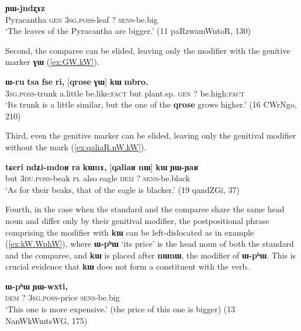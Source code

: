 \documentclass[oldfontcommands,oneside,a4paper,11pt]{article}
\newcommand{\ipa}[1]{{\phon\textbf{#1}}}
\begin{document}
\begin{exe}
\ex \label{ex:GW.WjwaR.kW}
\gll 
[\ipa{tɤru}  	\ipa{ɣɯ}  	\ipa{ɯ-jwaʁ}]  	\ipa{kɯ}  	\ipa{ɲɯ-jndʐɤz}  \\
Pyracantha \textsc{gen} \textsc{3sg.poss}-leaf ?{ } \textsc{sens}-be.big \\
\glt `The leaves of the Pyracantha are bigger.' (11 paRzwamWntoR, 130)
 \end{exe}
 
Second,  the comparee can be elided, leaving only the modifier with the genitive marker \ipa{ɣɯ} (\ref{ex:GW.kW}).  

\begin{exe}
\ex \label{ex:GW.kW}
\gll 
\ipa{ɯ-ru}  	\ipa{tsa}  	\ipa{fse}  	\ipa{ri,}  	[\ipa{qrose}  	\ipa{ɣɯ}]  	\ipa{kɯ}  	\ipa{mbro.}  \\
\textsc{3sg.poss}-trunk a.little be.like:\textsc{fact} but plant.sp. \textsc{gen} ?{ } be.high:\textsc{fact} \\
\glt `Its  trunk is a little similar, but the one of the \ipa{qrose} grows higher.' (16 CWrNgo,  210)
\end{exe}

Third, even the genitive marker can be elided, leaving only the genitival modifier without the mark (\ref{ex:qaliaR.nW.kW}).

\begin{exe}
\ex \label{ex:qaliaR.nW.kW}
\gll 
\ipa{tɕeri}  	\ipa{ndʑi-mdoʁ}  	\ipa{ra}  	\ipa{kɯnɤ,}  	[\ipa{qaliaʁ}  	\ipa{nɯ}]  	\ipa{kɯ}  	\ipa{ɲɯ-ɲaʁ}  \\
but \textsc{3du.poss}-beak \textsc{pl} also eagle \textsc{dem} ?{ } \textsc{sens}-be.black \\
\glt `As for their beaks, that of the eagle is blacker.' (19 qandZGi, 37)
\end{exe}

Fourth, in the case when   the standard and the comparee share the same head noun and differ only by their genitival modifier, the postpositional phrase comprising the modifier with \ipa{kɯ} can be left-dislocated as in example (\ref{ex:kW.WphW}), where \ipa{ɯ-pʰɯ} `its price' is the head noun of both the standard and the comparee, and \ipa{kɯ} is placed after \ipa{nɯnɯ}, the  modifier of   \ipa{ɯ-pʰɯ}.  This is crucial evidence that \ipa{kɯ} does not form a constituent with the verb.

 \begin{exe}
\ex \label{ex:kW.WphW}
\gll 
[\ipa{nɯnɯ}]  	\ipa{kɯ}  	\ipa{ɯ-pʰɯ}  	\ipa{ɲɯ-wxti,}  \\
\textsc{dem} ?{ } \textsc{3sg.poss}-price \textsc{sens}-be.big \\
\glt `This one is more expensive.' (the price of this one is bigger) (13 NanWkWmtsWG, 175)
\end{exe}
\end{document}
